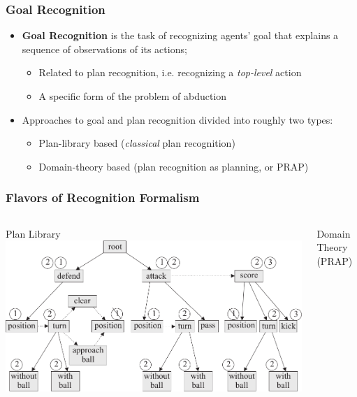 \documentclass{beamer}
\begin{document}
	\begin{frame}[c]\frametitle{Goal Recognition}
		\begin{itemize}
			\item \textbf{Goal Recognition} is the task of recognizing agents' goal that explains a sequence of observations of its actions;
			\begin{itemize}
				\item Related to plan recognition, i.e. recognizing a \emph{top-level} action
				\item A specific form of the problem of abduction 
			\end{itemize}
			\item Approaches to goal and plan recognition divided into roughly two types:
			\begin{itemize}
				\item Plan-library based (\emph{classical} plan recognition)
				\item Domain-theory based (plan recognition as planning, or PRAP)
			\end{itemize}
		\end{itemize}
	\end{frame}
	
	\begin{frame}[c]\frametitle{Flavors of Recognition Formalism}
		\begin{columns}
			\begin{column}[t]{0.5\textwidth}
				Plan Library
				\includegraphics[width=\textwidth]{examples/fig_plan_library.pdf}
			\end{column}
			\begin{column}[t]{0.5\textwidth}
				Domain Theory (PRAP)
				
			\end{column}
		\end{columns}
	\end{frame}
	
\end{document}
